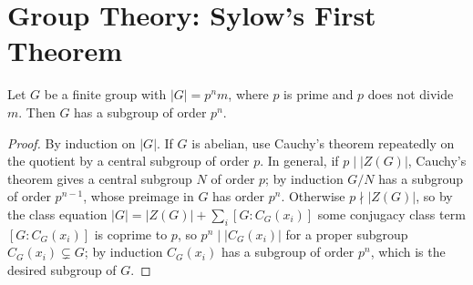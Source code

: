 \section{Group Theory: Sylow's First Theorem}

\begin{theorem}
Let $G$ be a finite group with $|G| = p^n m$, where $p$ is prime and $p$ does
not divide $m$. Then $G$ has a subgroup of order $p^n$.
\end{theorem}

\begin{proof}
By induction on $|G|$. If $G$ is abelian, use Cauchy's theorem repeatedly on
the quotient by a central subgroup of order $p$. In general, if $p \mid |Z(G)|$,
Cauchy's theorem gives a central subgroup $N$ of order $p$; by induction
$G/N$ has a subgroup of order $p^{n-1}$, whose preimage in $G$ has order $p^n$.
Otherwise $p \nmid |Z(G)|$, so by the class equation
$|G| = |Z(G)| + \sum_i [G : C_G(x_i)]$ some conjugacy class term
$[G : C_G(x_i)]$ is coprime to $p$, so $p^n \mid |C_G(x_i)|$ for a
proper subgroup $C_G(x_i) \subsetneq G$; by induction $C_G(x_i)$ has a
subgroup of order $p^n$, which is the desired subgroup of $G$.
\end{proof}
